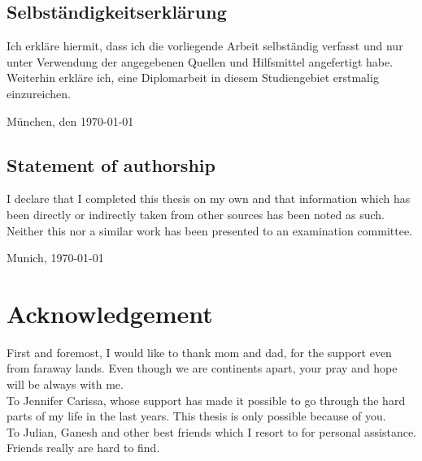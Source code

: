 \documentclass[pdftex,12pt,a4paper]{report}
\begin{document}
{\parindent 0cm
  
  \section*{Selbst\"andigkeitserkl\"arung}
  Ich erkl\"are hiermit, dass ich die vorliegende Arbeit selbst\"andig verfasst 
  und nur unter Verwendung der angegebenen Quellen und Hilfsmittel angefertigt habe. 
  Weiterhin erkl\"are ich, eine Diplomarbeit in diesem Studiengebiet erstmalig einzureichen.\\
  \vspace{3\baselineskip}
  
  M\"unchen, den \today \hspace{0.1\linewidth}\parbox{0.3\linewidth}{\dotfill}


\section*{Statement of authorship}
I declare that I completed this thesis on my own and that information which has been 
directly or indirectly taken from other sources has been noted as such. Neither this 
nor a similar work has been presented to an examination committee.

  \vspace{3\baselineskip}
  
  Munich, \today \hspace{0.1\linewidth}\parbox{0.3\linewidth}{\dotfill}
}

\newpage

\chapter*{Acknowledgement}

First and foremost, I would like to thank mom and dad, for the support even from faraway lands. Even though we are continents apart, your pray and hope will be always with me.\\

To Jennifer Carissa, whose support has made it possible to go through the hard parts of my life in the last years. This thesis is only possible because of you.\\

To Julian, Ganesh and other best friends which I resort to for personal assistance. Friends really are hard to find.\\
\end{document}
